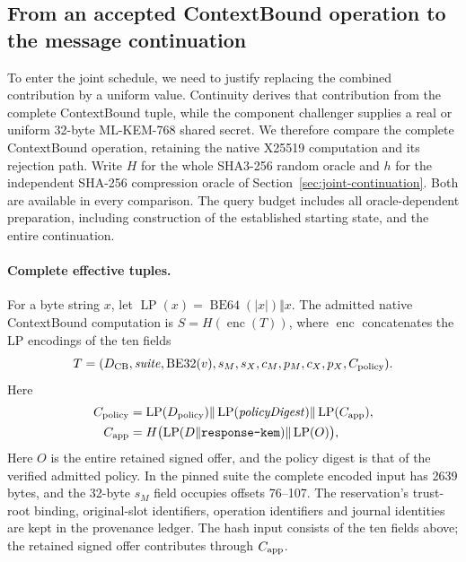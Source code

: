 \documentclass[pdflatex]{sn-jnl}
\theoremstyle{thmstyleone}
\theoremstyle{thmstylethree}
\theoremstyle{thmstyletwo}
\begin{document}
\subsection{From an accepted ContextBound operation to the message continuation}
\label{sec:contextbound-connection}

To enter the joint schedule, we need to justify replacing the combined
contribution by a uniform value. Continuity derives that contribution
from the complete ContextBound tuple, while
the component challenger supplies a real or uniform 32-byte ML-KEM-768
shared secret. We therefore compare the complete ContextBound operation,
retaining the native X25519 computation and its rejection path.
Write $H$ for the whole SHA3-256 random oracle and $h$ for
the independent SHA-256 compression oracle of
Section~\ref{sec:joint-continuation}. Both are available in every
comparison. The query budget includes all oracle-dependent preparation,
including construction of the established starting state, and the
entire continuation.

\paragraph{Complete effective tuples.}
For a byte string $x$, let
$\operatorname{LP}(x)=\operatorname{BE64}(|x|)\Vert x$.
The admitted native ContextBound computation is $S=H(\operatorname{enc}(T))$,
where $\operatorname{enc}$ concatenates the LP encodings of the ten fields
\[
 T=(D_{\rm CB},\mathit{suite},\operatorname{BE32}(v),
 s_M,s_X,c_M,p_M,c_X,p_X,C_{\rm policy}).
\]
Here
\[
\begin{aligned}
 C_{\rm policy}
 &=\operatorname{LP}(D_{\rm policy})
   \Vert\operatorname{LP}(\mathit{policyDigest})
   \Vert\operatorname{LP}(C_{\rm app}),\\
 C_{\rm app}
 &=H\bigl(\operatorname{LP}(D\Vert\texttt{response-kem})
                \Vert\operatorname{LP}(O)\bigr),
\end{aligned}
\]
Here $O$ is the entire retained signed offer, and the policy digest is that of
the verified admitted policy. In the pinned suite the complete encoded input
has 2639 bytes, and the 32-byte $s_M$ field occupies offsets 76--107.
The reservation's trust-root binding, original-slot identifiers, operation
identifiers and journal identities are kept in the provenance ledger.
The hash input consists of the ten fields above; the retained signed offer
contributes through $C_{\rm app}$.
\end{document}
